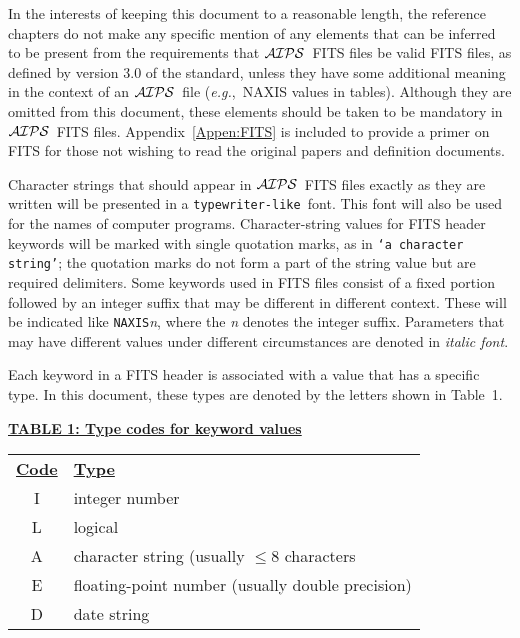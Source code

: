 \documentclass[twoside]{article}
\newcommand{\AIPS}{{$\cal AIPS\/$}}
\newcommand{\eg}{{\it e.g.},}
\begin{document}
In the interests of keeping this document to a reasonable length, the
reference chapters do not make any specific mention of any elements
that can be inferred to be present from the requirements that \AIPS\
FITS files be valid FITS files, as defined by version 3.0 of the
standard, unless they have some additional meaning in the context of
an \AIPS\ file (\eg\ NAXIS values in tables).  Although they are
omitted from this document, these elements should be taken to be
mandatory in \AIPS\ FITS files.  Appendix~\ref{Appen:FITS} is included
to provide a primer on FITS for those not wishing to read the original
papers and definition documents.

Character strings that should appear in \AIPS\ FITS files exactly as
they are written will be presented in a {\tt typewriter-like }font.
This font will also be used for the names of computer programs.
Character-string values for FITS header keywords will be marked with
single quotation marks, as in {\tt `a character string'}; the
quotation marks do not form a part of the string value but are
required delimiters.  Some keywords used in FITS files consist of a
fixed portion followed by an integer suffix that may be different in
different context.  These will be indicated like {\tt NAXIS}{\it n},
where the {\it n} denotes the integer suffix.  Parameters that may
have different values under different circumstances are denoted in
{\it italic font}.

Each keyword in a FITS header is associated with a value that has a
specific type.  In this document, these types are denoted by the
letters shown in Table~1.

\begin{center}
\underline{\bf{TABLE 1: Type codes for keyword values}}\\
\begin{tabular}{cl}
\noalign{\vspace{2pt}} \label{ta:keycodes}
\underline{{\bf Code\vphantom{y}}} & \underline{\bf{Type}} \\
\noalign{\vspace{2pt}}
 I & integer number \\
 L & logical \\
 A & character string (usually $\leq 8$ characters\\
 E & floating-point number (usually double precision) \\
 D & date string
\end{tabular}
\end{center}
\end{document}
